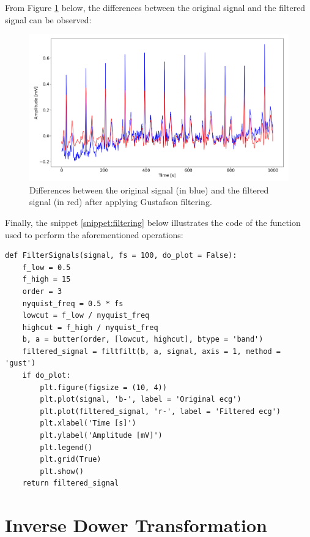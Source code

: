 \documentclass[12pt,english]{report}
\begin{document}
From Figure \ref{fig:filtering} below, the differences between the original signal and the filtered signal can be observed:

\begin{figure}[H]
    \centering
    \includegraphics[width=1\textwidth]{images/filtering.png}
    \captionsetup{justification=centering}
    \caption{Differences between the original signal (in blue) and the filtered signal (in red) after applying Gustafson filtering.}
    \label{fig:filtering}
\end{figure}

Finally, the snippet \ref{snippet:filtering} below illustrates the code of the function used to perform the aforementioned operations:

\lstset{language=Python}
\begin{lstlisting}[aboveskip=15pt, belowskip=15pt, basicstyle=\fontsize{8}{10}\selectfont, keywordstyle=\color{blue}, breaklines=true, label=snippet:filtering]
def FilterSignals(signal, fs = 100, do_plot = False):
    f_low = 0.5
    f_high = 15
    order = 3
    nyquist_freq = 0.5 * fs
    lowcut = f_low / nyquist_freq
    highcut = f_high / nyquist_freq
    b, a = butter(order, [lowcut, highcut], btype = 'band')
    filtered_signal = filtfilt(b, a, signal, axis = 1, method = 'gust')
    if do_plot:
        plt.figure(figsize = (10, 4))
        plt.plot(signal, 'b-', label = 'Original ecg')
        plt.plot(filtered_signal, 'r-', label = 'Filtered ecg')
        plt.xlabel('Time [s]')
        plt.ylabel('Amplitude [mV]')
        plt.legend()
        plt.grid(True)
        plt.show()
    return filtered_signal
\end{lstlisting}

\section{Inverse Dower Transformation}
\label{sec:matrice}
\end{document}
